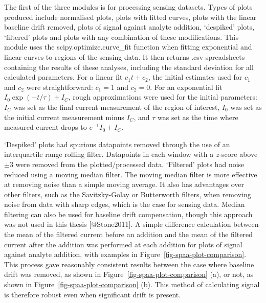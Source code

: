 \documentclass[
  letterpaper,
  DIV=11,
  numbers=noendperiod]{scrartcl}
\begin{document}
The first of the three modules is for processing sensing datasets. Types
of plots produced include normalised plots, plots with fitted curves,
plots with the linear baseline drift removed, plots of signal against
analyte addition, `despiked' plots, `filtered' plots and plots with any
combination of these modifications. This module uses the
scipy.optimize.curve\_fit function when fitting exponential and linear
curves to regions of the sensing data. It then returns .csv spreadsheets
containing the results of these analyses, including the standard
deviation for all calculated parameters. For a linear fit
\(c_1t + c_2\), the initial estimates used for \(c_1\) and \(c_2\) were
straightforward: \(c_1=1\) and \(c_2=0\). For an exponential fit
\(I_0\exp{(-t/\tau)} + I_C\), rough approximations were used for the
initial parameters: \(I_C\) was set as the final current measurement of
the region of interest, \(I_0\) was set as the initial current
measurement minus \(I_C\), and \(\tau\) was set as the time where
measured current drops to \(e^{-1}I_0 + I_C\).

`Despiked' plots had spurious datapoints removed through the use of an
interquartile range rolling filter. Datapoints in each window with a
\(z\)-score above \(\pm 3\) were removed from the plotted/processed
data. `Filtered' plots had noise reduced using a moving median filter.
The moving median filter is more effective at removing noise than a
simple moving average. It also has advantages over other filters, such
as the Savitzky-Golay or Butterworth filters, when removing noise from
data with sharp edges, which is the case for sensing data. Median
filtering can also be used for baseline drift compensation, though this
approach was not used in this thesis {[}@Stone2011{]}. A simple
difference calculation between the mean of the filtered current before
an addition and the mean of the filtered current after the addition was
performed at each addition for plots of signal against analyte addition,
with examples in Figure~\ref{fig-spaa-plot-comparison}. This process
gave reasonably consistent results between the case where baseline drift
was removed, as shown in Figure~\ref{fig-spaa-plot-comparison} (a), or
not, as shown in Figure~\ref{fig-spaa-plot-comparison} (b). This method
of calculating signal is therefore robust even when significant drift is
present.
\end{document}
